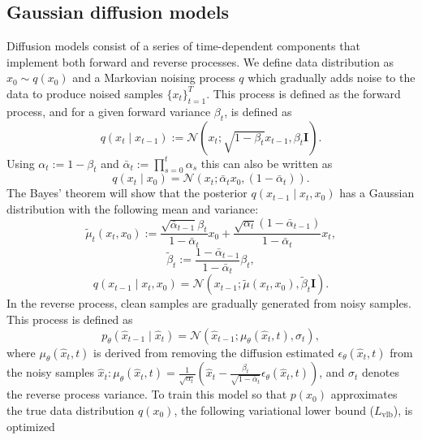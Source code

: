 \documentclass{article}
\begin{document}
\subsection{Gaussian diffusion models}
Diffusion models consist of a series of time-dependent components that implement both forward and reverse processes. We define data distribution as $x_0 \sim q(x_0)$ and a Markovian noising process $q$ which gradually adds noise to the data to produce noised samples $\{x_t\}_{t=1}^T$. This process is defined as the forward process, and for a given forward variance $\beta_t$, is defined as
\begin{equation}
    q\left(x_t \mid x_{t-1}\right):=\mathcal{N}\left(x_t ; \sqrt{1-\beta_t} x_{t-1}, \beta_t \mathbf{I}\right). 
\end{equation}
Using $\alpha_t:=1-\beta_t$ and $\bar{\alpha}_t:=\prod_{s=0}^t \alpha_s$ this can also be written as
\begin{equation}
    q\left(x_t \mid x_0\right)=\mathcal{N}\left(x_t ; \bar{\alpha}_t x_0,\left(1-\bar{\alpha}_t\right)\right).
\end{equation}
The Bayes' theorem will show that the posterior $q\left(x_{t-1} \mid x_t, x_0\right) $ has a Gaussian distribution with the following mean and variance: 
\begin{equation}
\tilde{\mu}_t\left(x_t, x_0\right)  :=\frac{\sqrt{\bar{\alpha}_{t-1}} \beta_t}{1-\bar{\alpha}_t} x_0+\frac{\sqrt{\alpha_t}\left(1-\bar{\alpha}_{t-1}\right)}{1- \bar{\alpha}_t} x_t,
\end{equation}
\begin{equation}
\tilde{\beta}_t  :=\frac{1-\bar{\alpha}_{t-1}}{1-\bar{\alpha}_t} \beta_t,
\end{equation}
\begin{equation}
    q\left(x_{t-1} \mid x_t, x_0\right)  =\mathcal{N}\left(x_{t-1} ; \tilde{\mu}\left(x_t, x_0\right), \tilde{\beta}_t \mathbf{I}\right).
\end{equation}
In the reverse process, clean samples are gradually generated from noisy samples. This process is defined as
\begin{equation}
    p_\theta\left(\widehat{x}_{t-1} \mid \widehat{x}_t\right)=\mathcal{N}\left(\widehat{x}_{t-1} ; \mu_\theta\left(\widehat{x}_t, t\right), \sigma_t\right),
\end{equation}
where $\mu_\theta\left(\widehat{x}_t, t\right)$ is derived from removing the diffusion estimated $\epsilon_\theta\left(\widehat{x}_t, t\right)$ from the noisy samples $\widehat{x}_t: \mu_\theta\left(\widehat{x}_t, t\right)=\frac{1}{\sqrt{\alpha_t}}\left(\widehat{x}_t-\frac{\beta_t}{\sqrt{1-\bar{\alpha}_t}} \epsilon_\theta\left(\widehat{x}_t, t\right)\right)$, and  $\sigma_t$ denotes the reverse process variance. To train this model so that $p(x_0)$ approximates the true data distribution $q(x_0)$, the following variational lower bound ($L_{\mathrm{vlb}}$), is optimized
\end{document}
